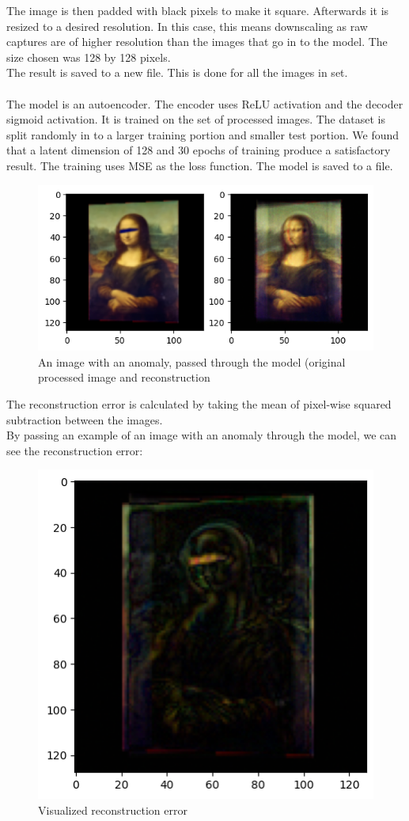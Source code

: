 \documentclass[a4paper,
  twoside, %
  headlines=2.1 %
  ]{scrartcl}
\begin{document}
\noindent The image is then padded with black pixels to make it square. Afterwards it is resized to a desired resolution. In this case, this means downscaling as raw captures are of higher resolution than the images that go in to the model. The size chosen was 128 by 128 pixels.
\\
The result is saved to a new file. This is done for all the images in set.
\\
\\
The model is an autoencoder. The encoder uses ReLU activation and the decoder sigmoid activation. It is trained on the set of processed images. The dataset is split randomly in to a larger training portion and smaller test portion. We found that a latent dimension of 128 and 30 epochs of training produce a satisfactory result. The training uses MSE as the loss function. The model is saved to a file.
\begin{figure}[H]
  \centering
  \includegraphics[scale=0.76]{model img pass 1.png}
  \caption{An image with an anomaly, passed through the model (original processed image and reconstruction}   
\end{figure}
The reconstruction error is calculated by taking the mean of pixel-wise squared subtraction between the images.
\\
By passing an example of an image with an anomaly through the model, we can see the reconstruction error:
\begin{figure}[H]
  \centering
  \includegraphics[scale=0.54]{model img recon diff 1.png}
  \caption{Visualized reconstruction error}   
\end{figure}
\end{document}
